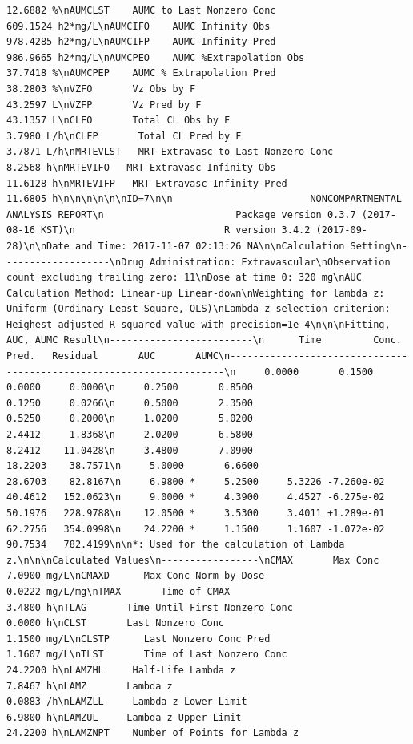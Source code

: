 \documentclass[12pt,]{krantz}
\theoremstyle{definition}
\theoremstyle{definition}
\theoremstyle{definition}
\theoremstyle{remark}
\begin{document}
\begin{verbatim}
12.6882 %\nAUMCLST    AUMC to Last Nonzero Conc                     609.1524 h2*mg/L\nAUMCIFO    AUMC Infinity Obs                             978.4285 h2*mg/L\nAUMCIFP    AUMC Infinity Pred                            986.9665 h2*mg/L\nAUMCPEO    AUMC %Extrapolation Obs                        37.7418 %\nAUMCPEP    AUMC % Extrapolation Pred                      38.2803 %\nVZFO       Vz Obs by F                                    43.2597 L\nVZFP       Vz Pred by F                                   43.1357 L\nCLFO       Total CL Obs by F                               3.7980 L/h\nCLFP       Total CL Pred by F                              3.7871 L/h\nMRTEVLST   MRT Extravasc to Last Nonzero Conc              8.2568 h\nMRTEVIFO   MRT Extravasc Infinity Obs                     11.6128 h\nMRTEVIFP   MRT Extravasc Infinity Pred                    11.6805 h\n\n\n\n\n\nID=7\n\n                        NONCOMPARTMENTAL ANALYSIS REPORT\n                       Package version 0.3.7 (2017-08-16 KST)\n                          R version 3.4.2 (2017-09-28)\n\nDate and Time: 2017-11-07 02:13:26 NA\n\nCalculation Setting\n-------------------\nDrug Administration: Extravascular\nObservation count excluding trailing zero: 11\nDose at time 0: 320 mg\nAUC Calculation Method: Linear-up Linear-down\nWeighting for lambda z: Uniform (Ordinary Least Square, OLS)\nLambda z selection criterion: Heighest adjusted R-squared value with precision=1e-4\n\n\nFitting, AUC, AUMC Result\n-------------------------\n      Time         Conc.      Pred.   Residual       AUC       AUMC\n---------------------------------------------------------------------\n     0.0000       0.1500                           0.0000     0.0000\n     0.2500       0.8500                           0.1250     0.0266\n     0.5000       2.3500                           0.5250     0.2000\n     1.0200       5.0200                           2.4412     1.8368\n     2.0200       6.5800                           8.2412    11.0428\n     3.4800       7.0900                          18.2203    38.7571\n     5.0000       6.6600                          28.6703    82.8167\n     6.9800 *     5.2500     5.3226 -7.260e-02    40.4612   152.0623\n     9.0000 *     4.3900     4.4527 -6.275e-02    50.1976   228.9788\n    12.0500 *     3.5300     3.4011 +1.289e-01    62.2756   354.0998\n    24.2200 *     1.1500     1.1607 -1.072e-02    90.7534   782.4199\n\n*: Used for the calculation of Lambda z.\n\n\nCalculated Values\n-----------------\nCMAX       Max Conc                                        7.0900 mg/L\nCMAXD      Max Conc Norm by Dose                           0.0222 mg/L/mg\nTMAX       Time of CMAX                                    3.4800 h\nTLAG       Time Until First Nonzero Conc                   0.0000 h\nCLST       Last Nonzero Conc                               1.1500 mg/L\nCLSTP      Last Nonzero Conc Pred                          1.1607 mg/L\nTLST       Time of Last Nonzero Conc                      24.2200 h\nLAMZHL     Half-Life Lambda z                              7.8467 h\nLAMZ       Lambda z                                        0.0883 /h\nLAMZLL     Lambda z Lower Limit                            6.9800 h\nLAMZUL     Lambda z Upper Limit                           24.2200 h\nLAMZNPT    Number of Points for Lambda z        
\end{verbatim}
\end{document}
